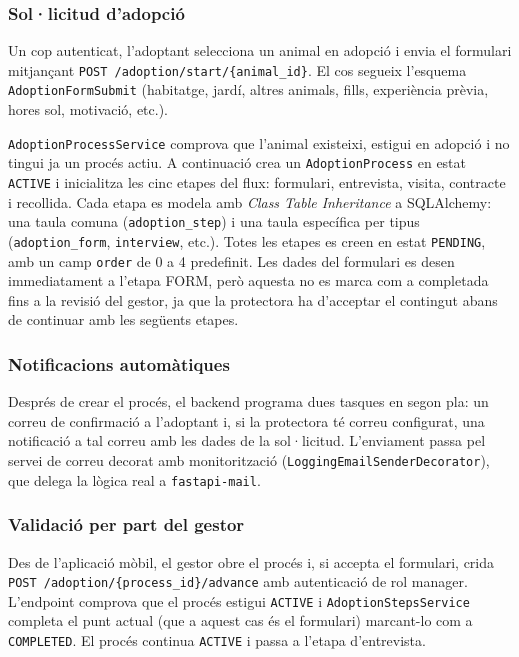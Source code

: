 \documentclass[11pt,a4paper]{report}
\begin{document}
\subsubsection{Sol·licitud d'adopció}
Un cop autenticat, l'adoptant selecciona un animal en adopció i envia el formulari mitjançant \texttt{POST /adoption/start/\{animal\_id\}}. El cos segueix l'esquema \texttt{AdoptionFormSubmit} (habitatge, jardí, altres animals, fills, experiència prèvia, hores sol, motivació, etc.).

\texttt{AdoptionProcessService} comprova que l'animal existeixi, estigui en adopció i no tingui ja un procés actiu. A continuació crea un \texttt{AdoptionProcess} en estat \texttt{ACTIVE} i inicialitza les cinc etapes del flux: formulari, entrevista, visita, contracte i recollida. Cada etapa es modela amb \textit{Class Table Inheritance} a SQLAlchemy: una taula comuna (\texttt{adoption\_step}) i una taula específica per tipus (\texttt{adoption\_form}, \texttt{interview}, etc.). Totes les etapes es creen en estat \texttt{PENDING}, amb un camp \texttt{order} de 0 a 4 predefinit. Les dades del formulari es desen immediatament a l'etapa FORM, però aquesta no es marca com a completada fins a la revisió del gestor, ja que la protectora ha d'acceptar el contingut abans de continuar amb les següents etapes.

\subsubsection{Notificacions automàtiques}
Després de crear el procés, el backend programa dues tasques en segon pla: un correu de confirmació a l'adoptant i, si la protectora té correu configurat, una notificació a tal correu amb les dades de la sol·licitud. L'enviament passa pel servei de correu decorat amb monitorització (\texttt{LoggingEmailSenderDecorator}), que delega la lògica real a \texttt{fastapi-mail}.

\subsubsection{Validació per part del gestor}
Des de l'aplicació mòbil, el gestor obre el procés i, si accepta el formulari, crida \texttt{POST /adoption/\{process\_id\}/advance} amb autenticació de rol manager. L'endpoint comprova que el procés estigui \texttt{ACTIVE} i \texttt{AdoptionStepsService} completa el punt actual (que a aquest cas és el formulari) marcant-lo com a \texttt{COMPLETED}. El procés continua \texttt{ACTIVE} i passa a l'etapa d'entrevista.
\end{document}
